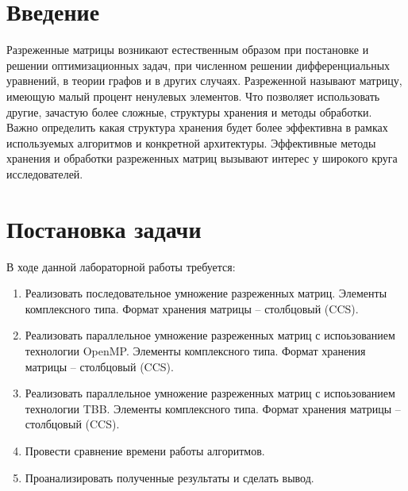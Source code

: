 \documentclass{report}
\begin{document}
\setcounter{page}{2}

\tableofcontents
\newpage

\section*{Введение}
\par Разреженные матрицы возникают естественным образом при постановке и решении оптимизационных задач, при численном решении дифференциальных уравнений, в теории графов и в других случаях. Разреженной называют матрицу, имеющую малый процент ненулевых элементов. Что позволяет использовать другие, зачастую более сложные, структуры хранения и методы обработки. Важно определить какая структура хранения будет более эффективна в рамках используемых алгоритмов и конкретной архитектуры. Эффективные методы хранения и обработки разреженных матриц вызывают интерес у широкого круга исследователей.
\newpage

\section*{Постановка задачи}
В ходе данной лабораторной работы требуется:
\begin{enumerate}
\item Реализовать последовательное умножение разреженных матриц. Элементы комплексного типа. Формат хранения матрицы – столбцовый (CCS).
\item Реализовать параллельное умножение разреженных матриц с испоьзованием технологии OpenMP. Элементы комплексного типа. Формат хранения матрицы – столбцовый (CCS).
\item Реализовать параллельное умножение разреженных матриц с испоьзованием технологии TBB. Элементы комплексного типа. Формат хранения матрицы – столбцовый (CCS).
\item Провести сравнение времени работы алгоритмов.
\item Проанализировать полученные результаты и сделать вывод.
\end{enumerate}
\newpage
\end{document}
